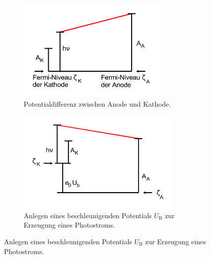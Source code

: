 \begin{figure}
    \begin{subfigure}{0.48\textwidth}
        \centering
        \includegraphics[height=5cm]{bilder/fermi1.pdf}
        \caption{Potentialdifferenz zwischen Anode und Kathode. \cite{v500}}
        \label{fig:fermi1}
    \end{subfigure}
    \hfill
    \begin{subfigure}{0.48\textwidth}
        \centering
        \includegraphics[height=5cm]{bilder/fermi2.pdf}
        \caption{Anlegen eines beschleunigenden Potentials $U_\text{B}$ zur Erzeugung eines Photostroms. \cite{v500}}
        \label{fig:fermi2}
    \end{subfigure}
\end{figure}